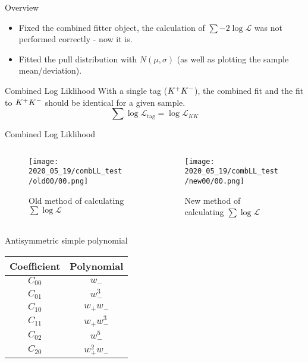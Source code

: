 \newcommand{\pullsnm}[2]{
\pullnm{#1}{Comb}{Combined Tags using #2}
\pullnm{#1}{KK}{$\KK$ Tag using #2}
\pullnm{#1}{Kspi0}{$\Kspiz$ Tag using #2}
\pullnm{#1}{Kppim}{$\Kppim$ Tag using #2}
\pullnm{#1}{Kmpip}{$\Kmpip$ Tag using #2}
\pullnm{#1}{Kspipi}{$\Kspipi$ Tag using #2}

}
\begin{frame}{Overview}
\begin{itemize}
\item Fixed the combined fitter object, the calculation of $\sum -2\log \mathcal{L}$ was not performed correctly - now it is.
\item Fitted the pull distribution with $N(\mu,\sigma)$ (as well as plotting the sample mean/deviation).
\end{itemize}
\end{frame}

\begin{frame}{Combined Log Liklihood}
With a single tag ($K^+ K^-$), the combined fit and the fit to $K^+ K^-$ should be identical for a given sample.
\begin{equation}
\sum \log \mathcal{L}_\text{tag} = \log \mathcal{L}_{KK}
\end{equation}
\end{frame}

\begin{frame}{Combined Log Liklihood}
\begin{columns}
\begin{column}{0.5\textwidth}
\begin{figure}
\texttt{[image: 2020\_05\_19/combLL\_test/old00/00.png]}
\caption{Old method of calculating $\sum \log \mathcal{L}$}
\end{figure}
\hfill
\end{column}
\begin{column}{0.5\textwidth}
\begin{figure}
\texttt{[image: 2020\_05\_19/combLL\_test/new00/00.png]}
\caption{New method of calculating $\sum \log \mathcal{L}$}
\end{figure}
\hfill
\end{column}
\end{columns}
\end{frame}

\begin{frame}{Antisymmetric simple polynomial}
\begin{center}
\begin{tabular}{|c|c|}
Coefficient & Polynomial \\ \hline
$C_{00}$ & $w_-$ \\
$C_{01}$ & $w_-^3$ \\
$C_{10}$ & $w_+ w_-$ \\
$C_{11}$ & $w_+ w_-^3$ \\
$C_{02}$ & $w_-^5$ \\
$C_{20}$ & $w_+^2 w_-$ \\ 
\end{tabular}
\end{center}
\end{frame}

